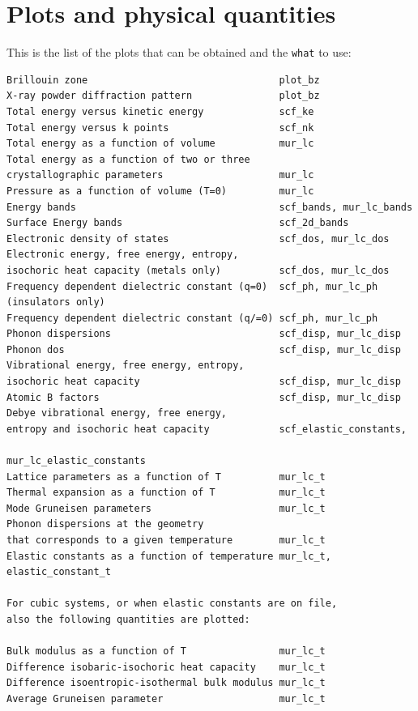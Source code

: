 \documentclass[12pt,a4paper]{article}
\begin{document}
\newpage

\section{\color{coral}Plots and physical quantities}
This is the list of the plots that can be obtained and 
the \texttt{what} to use:

\begin{verbatim}
Brillouin zone                                 plot_bz
X-ray powder diffraction pattern               plot_bz
Total energy versus kinetic energy             scf_ke
Total energy versus k points                   scf_nk
Total energy as a function of volume           mur_lc
Total energy as a function of two or three
crystallographic parameters                    mur_lc
Pressure as a function of volume (T=0)         mur_lc
Energy bands                                   scf_bands, mur_lc_bands
Surface Energy bands                           scf_2d_bands
Electronic density of states                   scf_dos, mur_lc_dos
Electronic energy, free energy, entropy,      
isochoric heat capacity (metals only)          scf_dos, mur_lc_dos
Frequency dependent dielectric constant (q=0)  scf_ph, mur_lc_ph
(insulators only)
Frequency dependent dielectric constant (q/=0) scf_ph, mur_lc_ph
Phonon dispersions                             scf_disp, mur_lc_disp
Phonon dos                                     scf_disp, mur_lc_disp
Vibrational energy, free energy, entropy,      
isochoric heat capacity                        scf_disp, mur_lc_disp
Atomic B factors                               scf_disp, mur_lc_disp
Debye vibrational energy, free energy, 
entropy and isochoric heat capacity            scf_elastic_constants, 
                                               mur_lc_elastic_constants
Lattice parameters as a function of T          mur_lc_t
Thermal expansion as a function of T           mur_lc_t 
Mode Gruneisen parameters                      mur_lc_t
Phonon dispersions at the geometry 
that corresponds to a given temperature        mur_lc_t
Elastic constants as a function of temperature mur_lc_t, elastic_constant_t

For cubic systems, or when elastic constants are on file,
also the following quantities are plotted:

Bulk modulus as a function of T                mur_lc_t
Difference isobaric-isochoric heat capacity    mur_lc_t
Difference isoentropic-isothermal bulk modulus mur_lc_t
Average Gruneisen parameter                    mur_lc_t

\end{verbatim}
\end{document}
